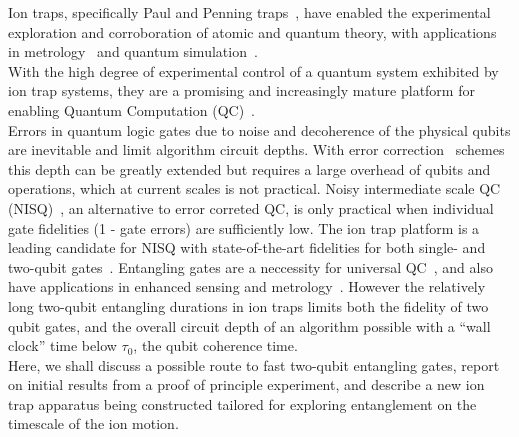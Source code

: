 \documentclass[12pt]{iopart}
\begin{document}
Ion traps, specifically Paul and Penning traps~\cite{paul_electromagnetic_1990, wineland_experimental_1998}, have enabled the
experimental exploration and corroboration of atomic and quantum
theory, with applications in metrology~\cite{ludlow_optical_2015} and quantum simulation~\cite{blatt_quantum_2012}. \\ With the high
degree of experimental control of a quantum system exhibited by ion
trap systems, they are a promising and increasingly mature platform
for enabling Quantum Computation (QC)~\cite{ozeri_tutorial_2011}.\\ Errors in quantum logic gates
due to noise and decoherence of the physical qubits are inevitable and
limit algorithm circuit depths. With error correction~\cite{steane_overhead_2003} schemes
this depth can be greatly extended but requires a large overhead of qubits
and operations, which at current scales is not practical.
Noisy intermediate scale QC (NISQ)~\cite{preskill_quantum_2018}, an alternative to error
correted QC, is only practical when individual gate fidelities (1 -
gate errors) are sufficiently low.  The ion trap platform is a leading
candidate for NISQ with state-of-the-art fidelities
for both single- and two-qubit gates~\cite{srinivas_high-fidelity_2021, ballance_high-fidelity_2016, harty_high-fidelity_2014}.  Entangling gates
are a neccessity for universal QC~\cite{divincenzo_physical_2000, blatt_entangled_2008}, and also have applications in
enhanced sensing and metrology~\cite{ono_entanglement-enhanced_2013, nichol_elementary_2022}.  However
the relatively long two-qubit entangling durations in ion traps limits
both the fidelity of two qubit gates, and the overall circuit
depth of an algorithm possible with a ``wall clock'' time below
$\tau_0$, the qubit coherence time.\\
Here, we shall discuss a possible route to fast two-qubit entangling
gates, report on initial results from a proof of principle experiment,
and describe a new ion trap apparatus being constructed tailored for
exploring entanglement on the timescale of the ion motion.\\
\end{document}
